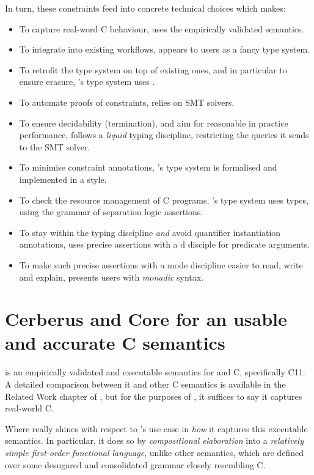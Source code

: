 In turn, these constraints feed into concrete technical choices which 
makes:
\begin{itemize}
    \item To capture real-word C behaviour,  uses the 
        empirically validated semantics.
    \item To integrate into existing workflows,  appears to users
        as a fancy type system.
    \item To retrofit the type system on top of existing ones, and in
	particular to ensure erasure, 's type system uses
	.
    \item To automate proofs of constraints,  relies on SMT solvers.
    \item To ensure decidability (termination), and aim for reasonable in
        practice performance,  follows a \emph{liquid} typing
	discipline, restricting the queries it sends to the SMT solver.
    \item To minimise constraint annotations, 's type system is
        formalised and implemented in a  style.
    \item To check the resource management of C programs, 's type
        system uses  types, using the grammar of separation
        logic assertions.
    \item To stay within the  typing discipline \emph{and} avoid
	quantifier instantiation annotations,  uses precise assertions
	with a d disciple for predicate arguments.
    \item To make such precise assertions with a mode discipline easier to read,
	write and explain,  presents users with \emph{monadic} syntax.
\end{itemize}

\section{Cerberus and Core for an usable and accurate C semantics}%
\label{sec:cerberus-core}

 is an empirically validated and executable semantics for
 and  C, specifically C11. A detailed comparison
between it and other C semantics is available in the Related Work chapter
of , but for the purposes of ,
it suffices to say it captures real-world C.

Where  really shines with respect to 's use case in
\emph{how} it captures this executable semantics. In particular, it does so by
\emph{compositional elaboration} into a \emph{relatively simple first-order
functional language}, unlike other semantics, which are defined over some
desugared and consolidated grammar closely resembling C.

